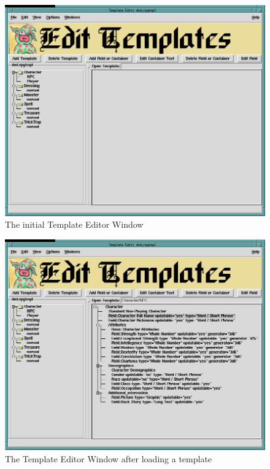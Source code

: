 \begin{figure}[hbpt]
\begin{centering}
\includegraphics[width=5in]{TemplateEditor1.png}
\caption{The initial Template Editor Window}
\label{fig:tmped1}
\end{centering}
\end{figure}

\begin{figure}[hbpt]
\begin{centering}
\includegraphics[width=5in]{TemplateEditor2.png}
\caption{The Template Editor Window after loading a template}
\label{fig:tmped2}
\end{centering}
\end{figure}

